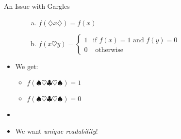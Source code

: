\documentclass[../slides.tex]{subfiles}
\begin{document}
\begin{frame}{An Issue with Gargles}
\begin{itemize}
\begin{enumerate}[(i)]
\begin{enumerate}[(a)]
				\item $f(\diamondsuit x\diamondsuit)=f(x)$
				
				\item $f(x\heartsuit y)=\begin{cases}
			1 & \text{if }f(x)=1\text{ and }f(y)=0\\
			0 &\text{ otherwise}
			\end{cases}$
			
			\end{enumerate}
			
		\end{enumerate}	
					
		\item We get: 
		
		\begin{itemize}
		
			\item $f(\spadesuit\heartsuit\clubsuit\heartsuit\spadesuit)=1$ 
			
			\item $f(\spadesuit\heartsuit\clubsuit\heartsuit\spadesuit)=0$
		
		\end{itemize}
		
		\item \frownie
		
		\item We want \emph{unique readability}!
		
	\end{itemize}


\end{frame}
\end{document}
